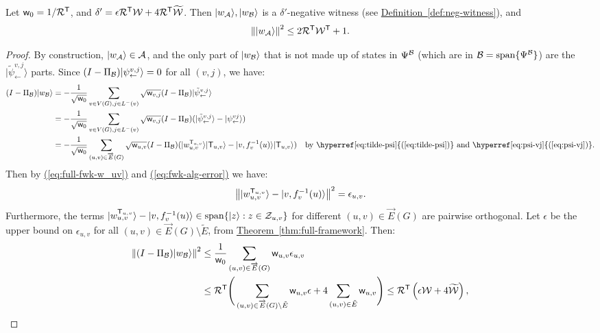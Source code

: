 \documentclass{article}
\newcommand{\eq}[1]{\hyperref[eq:#1]{(\ref*{eq:#1})}}
\newcommand{\thm}[1]{\hyperref[thm:#1]{Theorem~\ref*{thm:#1}}}
\newcommand{\defin}[1]{\hyperref[def:#1]{Definition~\ref*{def:#1}}}
\def\ket#1{{\lvert}#1\rangle}
\renewcommand{\>}{\rangle}
\newcommand{\<}{\langle}
\renewcommand{\(}{\left(}
\renewcommand{\)}{\right)}
\def\norm#1{\left\| #1 \right\|}
\def\w{{\sf w}}
\begin{document}
\begin{lemma}\label{lem:full-fwk-negative-error}
Let $\w_0=1/{\cal R}^{\sf T}$, and $\delta'=\epsilon {\cal R}^{\sf T}{\cal W}+4{\cal R}^{\sf T}\widetilde{\cal W}$. Then $\ket{w_{\cal A}},\ket{w_{\cal B}}$ is a $\delta'$-negative witness (see \defin{neg-witness}), and 
$$\norm{\ket{w_{\cal A}}}^2\leq 2{\cal R}^{\sf T}{\cal W}^{\sf T}+1.$$
\end{lemma}
\begin{proof}
By construction, $\ket{w_{\cal A}}\in {\cal A}$, and the only part of $\ket{w_{\cal B}}$ that is not made up of states in $\Psi^{\cal B}$ (which are in ${\cal B}=\mathrm{span}\{\Psi^{\cal B}\}$) are the $\ket{\tilde\psi_{\leftarrow}^{v,j}}$ parts. Since $(I-\Pi_{\cal B})\ket{\psi_{\leftarrow}^{v,j}}=0$ for all $(v,j)$, we have:
\begin{align*}
(I-\Pi_{\cal B})\ket{w_{\cal B}} &= -\frac{1}{\sqrt{\w_0}}\sum_{v\in V(G),j\in L^-(v)}\sqrt{\w_{v,j}}(I-\Pi_{\cal B})\ket{\tilde\psi_{\leftarrow}^{v,j}}\\
&=-\frac{1}{\sqrt{\w_0}}\sum_{v\in V(G),j\in L^-(v)}\sqrt{\w_{v,j}}(I-\Pi_{\cal B})(\ket{\tilde\psi_{\leftarrow}^{v,j}}-\ket{\psi_{\leftarrow}^{vj}})\\
&=-\frac{1}{\sqrt{\w_0}}\sum_{(u,v)\in\overrightarrow{E}(G)}\sqrt{\w_{u,v}}(I-\Pi_{\cal B})(\ket{w_{u,v}^{{\sf T}_{u,v}}}\ket{{\sf T}_{u,v}} - \ket{v,f_v^{-1}(u)}\ket{{\sf T}_{u,v}}) & \mbox{by \eq{tilde-psi} and \eq{psi-vj}}.
\end{align*}
Then by \eq{full-fwk-w_uv} and \eq{fwk-alg-error} we have:
\begin{equation*}
\norm{\ket{w_{u,v}^{{\sf T}_{u,v}}} - \ket{v,f_v^{-1}(u)}}^2 = \epsilon_{u,v}.
\end{equation*}
Furthermore, the terms $\ket{w_{u,v}^{{\sf T}_{u,v}}} - \ket{v,f_v^{-1}(u)}\in\mathrm{span}\{\ket{z}:z\in {\cal Z}_{u,v}\}$ for different $(u,v)\in \overrightarrow{E}(G)$ are pairwise orthogonal. 
Let $\epsilon$ be the upper bound on $\epsilon _{u,v}$ for all $(u,v)\in\overrightarrow{E}(G)\setminus\tilde{E}$, from \thm{full-framework}. Then:
\begin{align*}
\norm{(I-\Pi_{\cal B})\ket{w_{\cal B}}}^2 &\leq\frac{1}{{\w_0}}\sum_{(u,v)\in\overrightarrow{E}(G)}{\w_{u,v}}\epsilon_{u,v}\\
&\leq {\cal R}^{\sf T}\Bigg(\sum_{(u,v)\in\overrightarrow{E}(G)\setminus \tilde{E}}{\w_{u,v}}\epsilon + 4\sum_{(u,v)\in\tilde{E}}\w_{u,v}\Bigg) \leq {\cal R}^{\sf T}\left(\epsilon {\cal W}+4\widetilde{\cal W}\right),
\end{align*}

\end{proof}
\end{document}
